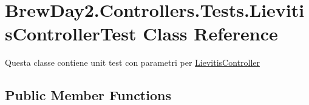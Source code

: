 \hypertarget{class_brew_day2_1_1_controllers_1_1_tests_1_1_lievitis_controller_test}{}\section{Brew\+Day2.\+Controllers.\+Tests.\+Lievitis\+Controller\+Test Class Reference}
\label{class_brew_day2_1_1_controllers_1_1_tests_1_1_lievitis_controller_test}


Questa classe contiene unit test con parametri per \mbox{\hyperlink{class_brew_day2_1_1_controllers_1_1_lievitis_controller}{Lievitis\+Controller}} 


\subsection*{Public Member Functions}

